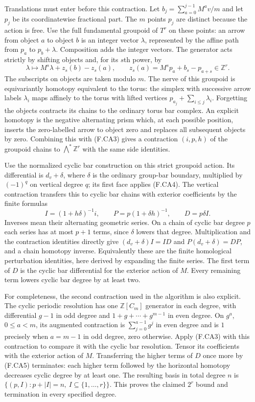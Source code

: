 Translations must enter before this contraction.  Let
$b_j=\sum_{a=0}^{j-1}M^av/m$ and let $p_j$ be its coordinatewise
fractional part.  The $m$ points $p_j$ are distinct because the
action is free.  Use the full fundamental groupoid of $T^r$
on these points: an arrow from object $a$ to object $b$ is an
integer vector $\lambda$, represented by the affine path from
$p_a$ to $p_b+\lambda$.  Composition adds the integer vectors.
The generator acts strictly by shifting objects and, for its
$s$th power, by
\[
 \lambda\longmapsto M^s\lambda+z_s(b)-z_s(a),
 \qquad z_s(a)=M^sp_a+b_s-p_{a+s}\in\mathbb Z^r.             \tag{F.CA4}
\]
The subscripts on objects are taken modulo $m$.
The nerve of this groupoid is equivariantly homotopy equivalent
to the torus: the simplex with successive arrow labels
$\lambda_i$ maps affinely to the torus with lifted vertices
$p_{a_j}+\sum_{i\leq j}\lambda_i$.
Forgetting the objects contracts its chains to the ordinary
torus bar complex.  An explicit homotopy is the negative
alternating prism which, at each possible position, inserts
the zero-labelled arrow to object zero and replaces all
subsequent objects by zero.  Combining this with (F.CA3)
gives a contraction $(i,p,h)$ of the groupoid chains to
$\bigwedge^*\mathbb Z^r$ with the same side identities.

Use the normalized cyclic bar construction on this strict
groupoid action.  Its differential is $d_v+\delta$, where
$\delta$ is the ordinary group-bar boundary, multiplied by
$(-1)^q$ on vertical degree $q$; its first face applies (F.CA4).
The vertical contraction transfers this to cyclic bar chains
with exterior coefficients by the finite formulas
\[
 I=(1+h\delta)^{-1}i,\qquad
 P=p(1+\delta h)^{-1},\qquad D=p\delta I.                  \tag{F.CA5}
\]
Inverses mean their alternating geometric series.  On a chain
of cyclic bar degree $p$ each series has at most $p+1$ terms,
since $\delta$ lowers that degree.  Multiplication and the
contraction identities directly give $(d_v+\delta)I=ID$ and
$P(d_v+\delta)=DP$,
and a chain homotopy inverse.  Equivalently these are the
finite homological perturbation identities, here derived by
expanding the finite series.  The first term of $D$ is the
cyclic bar differential for the exterior action of $M$.
Every remaining term lowers cyclic bar degree by at least two.

For completeness, the second contraction used in the algorithm
is also explicit.  The cyclic periodic resolution has one
$\mathbb Z[C_m]$ generator in each degree, with differential
$g-1$ in odd degree and $1+g+\cdots+g^{m-1}$ in even degree.
On $g^a$, $0\leq a<m$, its augmented contraction is
$\sum_{j=0}^{a-1}g^j$ in even degree and is $1$ precisely when
$a=m-1$ in odd degree, zero otherwise.
Apply (F.CA3) with this contraction to compare it with the
cyclic bar resolution.  Tensor its coefficients with the
exterior action of $M$.  Transferring the higher terms of $D$
once more by (F.CA5) terminates: each higher term followed by
the horizontal homotopy decreases cyclic degree by at least
one.  The resulting basis in total degree $n$ is
$\{(p,I):p+|I|=n,\ I\subseteq\{1,\ldots,r\}\}$.
This proves the claimed $2^r$ bound and termination in every
specified degree.

